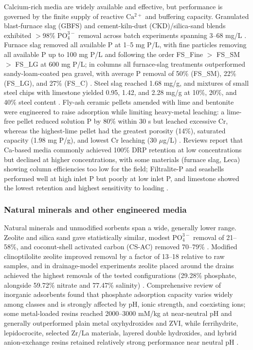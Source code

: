 \documentclass[11pt]{article}
\begin{document}
Calcium-rich media are widely available and effective, but performance is governed by the finite supply of reactive $\mathrm{Ca^{2+}}$ and buffering capacity. Granulated blast-furnace slag (GBFS) and cement-kiln-dust (CKD)/silica-sand blends exhibited $>$98\% $\mathrm{PO_4^{3-}}$ removal across batch experiments spanning 3--68 mg/L \parencite{Agrawal2011}. Furnace slag removed all available P at 1--5 mg P/L, with fine particles removing all available P up to 100 mg P/L and following the order FS\_Fine $>$ FS\_SM $>$ FS\_LG at 600 mg P/L; in columns all furnace-slag treatments outperformed sandy-loam-coated pea gravel, with average P removal of 50\% (FS\_SM), 22\% (FS\_LG), and 27\% (FS\_C) \parencite{Sanford2016}. Steel slag reached 1.68 mg/g, and mixtures of small steel chips with limestone yielded 0.95, 1.42, and 2.28 mg/g at 10\%, 20\%, and 40\% steel content \parencite{Sellner2019b}. Fly-ash ceramic pellets amended with lime and bentonite were engineered to raise adsorption while limiting heavy-metal leaching: a lime-free pellet reduced solution P by 80\% within 30 s but leached excessive Cr, whereas the highest-lime pellet had the greatest porosity (14\%), saturated capacity (1.98 mg P/g), and lowest Cr leaching (30 $\mu$g/L) \parencite{Li2017}. Reviews report that Ca-based media commonly achieved 100\% DRP retention at low concentrations but declined at higher concentrations, with some materials (furnace slag, Leca) showing column efficiencies too low for the field; Filtralite-P and seashells performed well at high inlet P but poorly at low inlet P, and limestone showed the lowest retention and highest sensitivity to loading \parencite{Mendes2022,Pugliese2023}.

\subsubsection{Natural minerals and other engineered media}

Natural minerals and unmodified sorbents span a wide, generally lower range. Zeolite and silica sand gave statistically similar, modest $\mathrm{PO_4^{3-}}$ removal of 21--58\%, and coconut-shell activated carbon (CS-AC) removed 70--79\% \parencite{Agrawal2011}. Modified clinoptilolite zeolite improved removal by a factor of 13--18 relative to raw samples, and in drainage-model experiments zeolite placed around the drains achieved the highest removals of the tested configurations (29.28\% phosphate, alongside 59.72\% nitrate and 77.47\% salinity) \parencite{Sadeghi2021}. Comprehensive review of inorganic adsorbents found that phosphate adsorption capacity varies widely among classes and is strongly affected by pH, ionic strength, and coexisting ions; some metal-loaded resins reached 2000--3000 mM/kg at near-neutral pH and generally outperformed plain metal oxyhydroxides and ZVI, while ferrihydrite, lepidocrocite, selected Zr/La materials, layered double hydroxides, and hybrid anion-exchange resins retained relatively strong performance near neutral pH \parencite{Li2020}.
\end{document}
